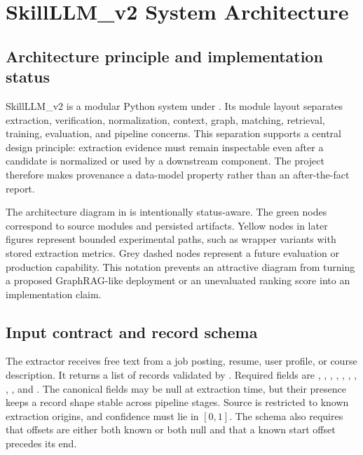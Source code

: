 \chapter{SkillLLM\_v2 System Architecture}
\label{ch:architecture}

\section{Architecture principle and implementation status}

SkillLLM\_v2 is a modular Python system under . Its module layout separates extraction, verification, normalization, context, graph, matching, retrieval, training, evaluation, and pipeline concerns. This separation supports a central design principle: extraction evidence must remain inspectable even after a candidate is normalized or used by a downstream component. The project therefore makes provenance a data-model property rather than an after-the-fact report.

The architecture diagram in  is intentionally status-aware. The green nodes correspond to source modules and persisted artifacts. Yellow nodes in later figures represent bounded experimental paths, such as wrapper variants with stored extraction metrics. Grey dashed nodes represent a future evaluation or production capability. This notation prevents an attractive diagram from turning a proposed GraphRAG-like deployment or an unevaluated ranking score into an implementation claim.



\section{Input contract and record schema}

The extractor receives free text from a job posting, resume, user profile, or course description. It returns a list of records validated by . Required fields are , , , , , , , , , and . The canonical fields may be null at extraction time, but their presence keeps a record shape stable across pipeline stages. Source is restricted to known extraction origins, and confidence must lie in $[0,1]$. The schema also requires that offsets are either both known or both null and that a known start offset precedes its end.

